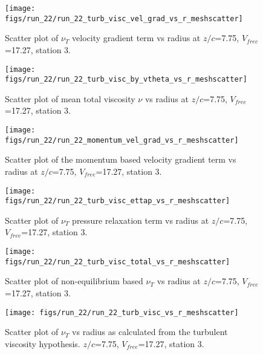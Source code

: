 \begin{figure}[H]
\centering
\texttt{[image: figs/run\_22/run\_22\_turb\_visc\_vel\_grad\_vs\_r\_meshscatter]}
\caption{Scatter plot of $\nu_T$ velocity gradient term vs radius at $z/c$=7.75, $V_{free}$=17.27, station 3.}
\end{figure}


\begin{figure}[H]
\centering
\texttt{[image: figs/run\_22/run\_22\_turb\_visc\_by\_vtheta\_vs\_r\_meshscatter]}
\caption{Scatter plot of mean total viscosity $\nu$ vs radius at $z/c$=7.75, $V_{free}$=17.27, station 3.}
\end{figure}


\begin{figure}[H]
\centering
\texttt{[image: figs/run\_22/run\_22\_momentum\_vel\_grad\_vs\_r\_meshscatter]}
\caption{Scatter plot of the momentum based velocity gradient term vs radius at $z/c$=7.75, $V_{free}$=17.27, station 3.}
\end{figure}


\begin{figure}[H]
\centering
\texttt{[image: figs/run\_22/run\_22\_turb\_visc\_ettap\_vs\_r\_meshscatter]}
\caption{Scatter plot of $\nu_T$ pressure relaxation term vs radius at $z/c$=7.75, $V_{free}$=17.27, station 3.}
\end{figure}


\begin{figure}[H]
\centering
\texttt{[image: figs/run\_22/run\_22\_turb\_visc\_total\_vs\_r\_meshscatter]}
\caption{Scatter plot of non-equilibrium based $\nu_T$ vs radius at $z/c$=7.75, $V_{free}$=17.27, station 3.}
\end{figure}


\begin{figure}[H]
\centering
\texttt{[image: figs/run\_22/run\_22\_turb\_visc\_vs\_r\_meshscatter]}
\caption{Scatter plot of $\nu_T$ vs radius as calculated from the turbulent viscosity hypothesis. $z/c$=7.75, $V_{free}$=17.27, station 3.}
\end{figure}


